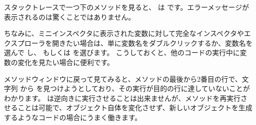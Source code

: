 \documentclass[a4paper,10pt,twoside]{book}
\begin{document}
スタックトレースで一つ下のメソッドを見ると、 は  です。エラーメッセージが表示されるのは驚くことではありません。

ちなみに、ミニインスペクタに表示された変数に対して完全なインスペクタやエクスプローラを開きたい場合は、単に変数名をダブルクリックするか、変数名を選んで \actclick し、 もしくは  を選びます。
こうしておくと、他のコードの実行中に変数の変化を見たい場合に便利です。

メソッドウィンドウに戻って見てみると、メソッドの最後から2番目の行で、文字列  から  を見つけようとしており、その実行が目的の行に達していないことがわかります。
\pharo は逆向きに実行させることは出来ませんが、メソッドを再実行させることは可能で、オブジェクト自体を変化させず、新しいオブジェクトを生成するようなコードの場合にうまく働きます。

\end{document}
